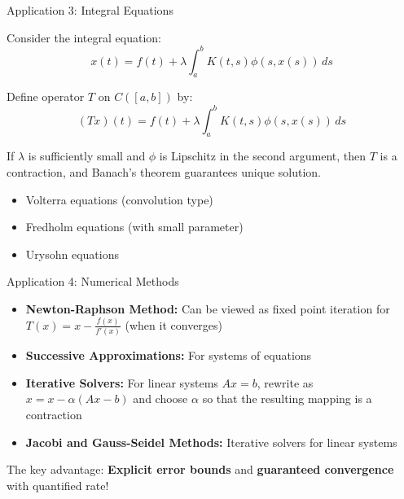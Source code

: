 \documentclass[aspectratio=169,10pt]{beamer}
\begin{document}
\begin{frame}{Application 3: Integral Equations}
    \begin{example}
        Consider the integral equation:
        \[
            x(t) = f(t) + \lambda \int_a^b K(t,s) \phi(s, x(s)) \, ds
        \]

        Define operator $T$ on $C([a,b])$ by:
        \[
            (Tx)(t) = f(t) + \lambda \int_a^b K(t,s) \phi(s, x(s)) \, ds
        \]

        If $\lambda$ is sufficiently small and $\phi$ is Lipschitz in the second argument, then $T$ is a contraction, and Banach's theorem guarantees unique solution.
    \end{example}

    \vspace{0.3cm}
    \begin{itemize}
        \item Volterra equations (convolution type)
        \item Fredholm equations (with small parameter)
        \item Urysohn equations
    \end{itemize}
\end{frame}

\begin{frame}{Application 4: Numerical Methods}
    \begin{itemize}
        \item \textbf{Newton-Raphson Method:} Can be viewed as fixed point iteration for $T(x) = x - \frac{f(x)}{f'(x)}$ (when it converges)

        \item \textbf{Successive Approximations:} For systems of equations

        \item \textbf{Iterative Solvers:} For linear systems $Ax = b$, rewrite as $x = x - \alpha(Ax - b)$ and choose $\alpha$ so that the resulting mapping is a contraction

        \item \textbf{Jacobi and Gauss-Seidel Methods:} Iterative solvers for linear systems
    \end{itemize}

    \vspace{0.3cm}
    The key advantage: \textbf{Explicit error bounds} and \textbf{guaranteed convergence} with quantified rate!
\end{frame}

\end{document}
